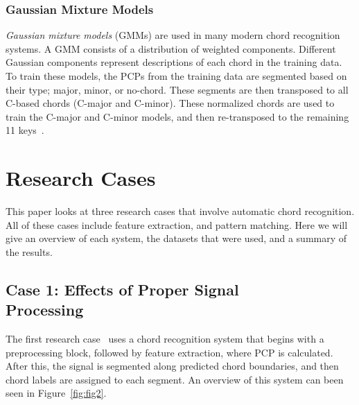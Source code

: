 \documentclass{sig-alternate}
\begin{document}

\subsubsection{Gaussian Mixture Models}

\textit{Gaussian mixture models} (GMMs) are used in many modern chord recognition systems. A GMM consists of a distribution of weighted components. Different Gaussian components represent descriptions of each chord in the training data. To train these models, the PCPs from the training data are segmented based on their type; major, minor, or no-chord. These segments are then transposed to all C-based chords (C-major and C-minor). These normalized chords are used to train the C-major and C-minor models, and then re-transposed to the remaining 11 keys~\cite{TaeMin:2014}.


%

\section{Research Cases}

This paper looks at three research cases that involve automatic chord recognition. All of these cases include feature extraction, and pattern matching. Here we will give an overview of each system, the datasets that were used, and a summary of the results.


\subsection{Case 1: Effects of Proper Signal \\ Processing}

The first research case~\cite{Morman:2006} uses a chord recognition system that begins with a preprocessing block, followed by feature extraction, where PCP is calculated. After this, the signal is segmented along predicted chord boundaries, and then chord labels are assigned to each segment. An overview of this system can been seen in Figure~\ref{fig:fig2}. 
\end{document}
